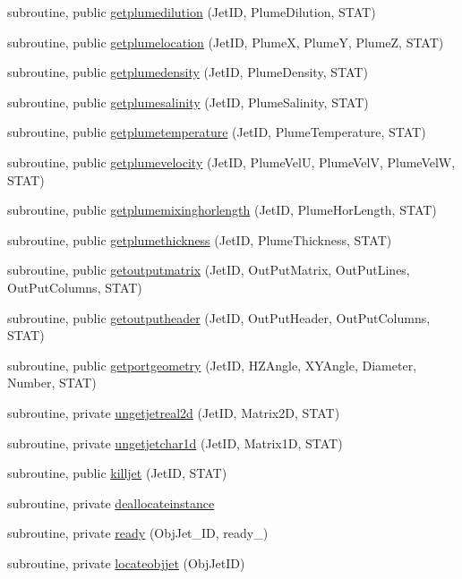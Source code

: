 \begin{DoxyCompactItemize}
subroutine, public \mbox{\hyperlink{namespacemodulejet_a5bd04e69691ddf86217eae82701cb7ea}{getplumedilution}} (Jet\+ID, Plume\+Dilution, S\+T\+AT)
\item 
subroutine, public \mbox{\hyperlink{namespacemodulejet_a864a38eff68cbab56308586d389f202b}{getplumelocation}} (Jet\+ID, PlumeX, PlumeY, PlumeZ, S\+T\+AT)
\item 
subroutine, public \mbox{\hyperlink{namespacemodulejet_aace5b51fdfea28b29ddf40d44b7805b4}{getplumedensity}} (Jet\+ID, Plume\+Density, S\+T\+AT)
\item 
subroutine, public \mbox{\hyperlink{namespacemodulejet_a6a3b06a4b31a48d3feabf8b545a6e8b2}{getplumesalinity}} (Jet\+ID, Plume\+Salinity, S\+T\+AT)
\item 
subroutine, public \mbox{\hyperlink{namespacemodulejet_aa64ddb0bd7c80f966b8ec54eb9a36c7c}{getplumetemperature}} (Jet\+ID, Plume\+Temperature, S\+T\+AT)
\item 
subroutine, public \mbox{\hyperlink{namespacemodulejet_ab7e7ab36f584f4edd9e7f7835d1e0cee}{getplumevelocity}} (Jet\+ID, Plume\+VelU, Plume\+VelV, Plume\+VelW, S\+T\+AT)
\item 
subroutine, public \mbox{\hyperlink{namespacemodulejet_a105341ffdec09f8266a68d6db9beba7f}{getplumemixinghorlength}} (Jet\+ID, Plume\+Hor\+Length, S\+T\+AT)
\item 
subroutine, public \mbox{\hyperlink{namespacemodulejet_a50ced2ba527ab243cd3228d18867695d}{getplumethickness}} (Jet\+ID, Plume\+Thickness, S\+T\+AT)
\item 
subroutine, public \mbox{\hyperlink{namespacemodulejet_a81ee4e71d54b53e9b3ab94bb817d66e8}{getoutputmatrix}} (Jet\+ID, Out\+Put\+Matrix, Out\+Put\+Lines, Out\+Put\+Columns, S\+T\+AT)
\item 
subroutine, public \mbox{\hyperlink{namespacemodulejet_af33eb9ee692e4270d09338bd74aa8851}{getoutputheader}} (Jet\+ID, Out\+Put\+Header, Out\+Put\+Columns, S\+T\+AT)
\item 
subroutine, public \mbox{\hyperlink{namespacemodulejet_adcc462c38759f6ba6caa1b8f33479fa8}{getportgeometry}} (Jet\+ID, H\+Z\+Angle, X\+Y\+Angle, Diameter, Number, S\+T\+AT)
\item 
subroutine, private \mbox{\hyperlink{namespacemodulejet_a3faa436f5c17dc03c594506d8e2e37ac}{ungetjetreal2d}} (Jet\+ID, Matrix2D, S\+T\+AT)
\item 
subroutine, private \mbox{\hyperlink{namespacemodulejet_aaa0ceb23e085072c0cf5693f217b27ea}{ungetjetchar1d}} (Jet\+ID, Matrix1D, S\+T\+AT)
\item 
subroutine, public \mbox{\hyperlink{namespacemodulejet_a98749a91e325a4b4041aa46d5abfde4e}{killjet}} (Jet\+ID, S\+T\+AT)
\item 
subroutine, private \mbox{\hyperlink{namespacemodulejet_aed198ff7ee371124ec0afa1cd4cfe116}{deallocateinstance}}
\item 
subroutine, private \mbox{\hyperlink{namespacemodulejet_a08cf17884b67eb6e393c3f7553f6398f}{ready}} (Obj\+Jet\+\_\+\+ID, ready\+\_\+)
\item 
subroutine, private \mbox{\hyperlink{namespacemodulejet_a0b2668a76b18f69741deda8796740f8f}{locateobjjet}} (Obj\+Jet\+ID)
\end{DoxyCompactItemize}

